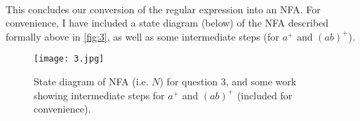 \documentclass{article}
\begin{document}
\paragraph{}

This concludes our conversion of the regular expression into an NFA.  For convenience, I have included a state diagram (below) of the NFA described formally above in \ref{fig:3}, as well as some intermediate steps (for $a^+$ and $(ab)^+$).  

\begin{figure}[H]
    \centering
    \texttt{[image: 3.jpg]}
    \caption{State diagram of NFA (i.e. $N$) for question 3, and some work showing intermediate steps for $a^+$ and $(ab)^+$ (included for convenience).  }
    \label{fig:my_label}
\end{figure}
\end{document}
